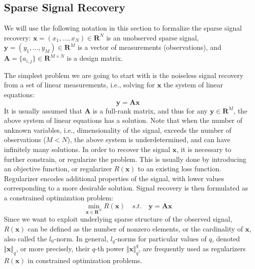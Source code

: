 \documentclass[journal]{IEEEtran}
\begin{document}
\subsection{Sparse Signal Recovery}
We will use the following notation in this section to formalize the sparse signal recovery: $\boldsymbol{x}=(x_1,...,x_N)\in \mathbf{R}^N$ is an unobserved sparse signal, $\boldsymbol{y}=(y_1,...,y_M)\in \mathbf{R}^M$ is a vector of measurements (observations), and $\boldsymbol{A}=\{a_{i,j}\}\in\mathbf{R}^{M\times N}$ is a design matrix. 

The simplest problem we are going to start with is the noiseless signal recovery from a set of linear measurements, i.e., solving for $\boldsymbol{x}$ the system of linear equations:
%
\begin{equation}
	\boldsymbol{y}=\boldsymbol{A} \boldsymbol{x}
\end{equation}
%
It is usually assumed that $\boldsymbol{A}$ is a full-rank matrix, and thus for any $\boldsymbol{y}\in\mathbf{R}^M$, the above system of linear equations has a solution. Note that when the number of unknown variables, i.e., dimensionality of the signal, exceeds the number of observations ($M<N$), the above system is underdetermined, and can have infinitely many solutions. In order to recover the signal $\boldsymbol{x}$, it is necessary to further constrain, or regularize the problem. This is usually done by introducing an objective function, or regularizer $R(\boldsymbol{x})$ to an existing loss function. Regularizer encodes additional properties of the signal, with lower values corresponding to a more desirable solution. Signal recovery is then formulated as a constrained optimization problem:
%
\begin{equation}
	\min\limits_{\boldsymbol{x}\in\mathbf{R}^N} R(\boldsymbol{x})\quad s.t.\quad \boldsymbol{y}=\boldsymbol{A}\boldsymbol{x}
\end{equation}
%
Since we want to exploit underlying sparse structure of the observed signal, $R(\boldsymbol{x})$ can be defined as the number of nonzero elements, or the cardinality of $\boldsymbol{x}$, also called the $l_0$-norm. In general, $l_q$-norms for particular values of $q$, denoted $\Vert \boldsymbol{x}\Vert_q$, or more precisely, their $q$-th power $\Vert \boldsymbol{x}\Vert_q^q$, are frequently used as regularizers $R(\boldsymbol{x})$ in constrained optimization problems.
\end{document}
